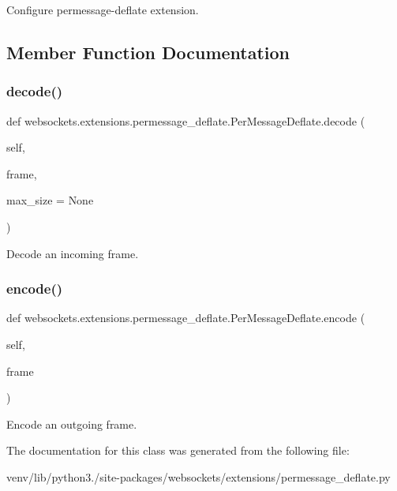 \begin{DoxyVerb}Configure permessage-deflate extension.\end{DoxyVerb}
 

\subsection{Member Function Documentation}
\mbox{\label{classwebsockets_1_1extensions_1_1permessage__deflate_1_1_per_message_deflate_a217dda0fb28f23b7071546827388c32b}} 
\subsubsection{\texorpdfstring{decode()}{decode()}}
{\footnotesize\ttfamily def websockets.\+extensions.\+permessage\+\_\+deflate.\+Per\+Message\+Deflate.\+decode (\begin{DoxyParamCaption}\item[{}]{self,  }\item[{}]{frame,  }\item[{}]{max\+\_\+size = {\ttfamily None} }\end{DoxyParamCaption})}

\begin{DoxyVerb}Decode an incoming frame.\end{DoxyVerb}
 \mbox{\label{classwebsockets_1_1extensions_1_1permessage__deflate_1_1_per_message_deflate_afbfa9d104a30d2b691356f067b380ca5}} 
\subsubsection{\texorpdfstring{encode()}{encode()}}
{\footnotesize\ttfamily def websockets.\+extensions.\+permessage\+\_\+deflate.\+Per\+Message\+Deflate.\+encode (\begin{DoxyParamCaption}\item[{}]{self,  }\item[{}]{frame }\end{DoxyParamCaption})}

\begin{DoxyVerb}Encode an outgoing frame.\end{DoxyVerb}
 

The documentation for this class was generated from the following file\+:\begin{DoxyCompactItemize}
\item 
venv/lib/python3./site-\/packages/websockets/extensions/permessage\+\_\+deflate.\+py\end{DoxyCompactItemize}
